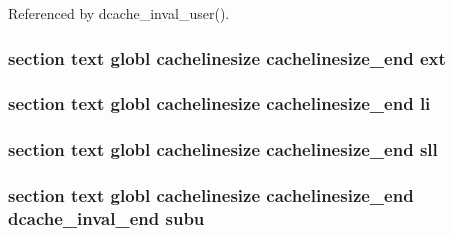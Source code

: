 Referenced by dcache\-\_\-inval\-\_\-user().

\hypertarget{mips_2cache_8S_a02cd0d788f29d77066a7350052ce390e}{
\subsubsection[{ext}]{\setlength{\rightskip}{0pt plus 5cm}section text globl {\bf cachelinesize} {\bf cachelinesize\-\_\-end} ext}}\label{mips_2cache_8S_a02cd0d788f29d77066a7350052ce390e}
\hypertarget{mips_2cache_8S_a006417f92f633572be034047f70ba27b}{
\subsubsection[{li}]{\setlength{\rightskip}{0pt plus 5cm}section text globl {\bf cachelinesize} {\bf cachelinesize\-\_\-end} li}}\label{mips_2cache_8S_a006417f92f633572be034047f70ba27b}
\hypertarget{mips_2cache_8S_a5c1932d214a99dcd33423d675b3b860a}{
\subsubsection[{sll}]{\setlength{\rightskip}{0pt plus 5cm}section text globl {\bf cachelinesize} {\bf cachelinesize\-\_\-end} sll}}\label{mips_2cache_8S_a5c1932d214a99dcd33423d675b3b860a}
\hypertarget{mips_2cache_8S_a557a95c2e71cd7fd74aa19f5e26f685b}{
\subsubsection[{subu}]{\setlength{\rightskip}{0pt plus 5cm}section text globl {\bf cachelinesize} {\bf cachelinesize\-\_\-end} {\bf dcache\-\_\-inval\-\_\-end} subu}}\label{mips_2cache_8S_a557a95c2e71cd7fd74aa19f5e26f685b}
